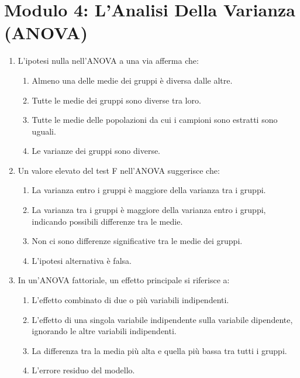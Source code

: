 \documentclass[12pt, a4paper]{article}
\begin{document}
\section*{Modulo 4: L'Analisi Della Varianza (ANOVA)}
\begin{enumerate}[resume]
    \item L'ipotesi nulla nell'ANOVA a una via afferma che:
    \begin{enumerate}
        \item Almeno una delle medie dei gruppi è diversa dalle altre.
        \item Tutte le medie dei gruppi sono diverse tra loro.
        \item Tutte le medie delle popolazioni da cui i campioni sono estratti sono uguali.
        \item Le varianze dei gruppi sono diverse.
    \end{enumerate}
    \vspace{0.3cm}

    \item Un valore elevato del test F nell'ANOVA suggerisce che:
    \begin{enumerate}
        \item La varianza entro i gruppi è maggiore della varianza tra i gruppi.
        \item La varianza tra i gruppi è maggiore della varianza entro i gruppi, indicando possibili differenze tra le medie.
        \item Non ci sono differenze significative tra le medie dei gruppi.
        \item L'ipotesi alternativa è falsa.
    \end{enumerate}
    \vspace{0.3cm}

    \item In un'ANOVA fattoriale, un effetto principale si riferisce a:
    \begin{enumerate}
        \item L'effetto combinato di due o più variabili indipendenti.
        \item L'effetto di una singola variabile indipendente sulla variabile dipendente, ignorando le altre variabili indipendenti.
        \item La differenza tra la media più alta e quella più bassa tra tutti i gruppi.
        \item L'errore residuo del modello.
    \end{enumerate}
    \vspace{0.3cm}


\end{enumerate}
\end{document}
